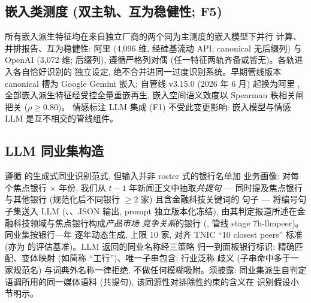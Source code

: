 \subsection{嵌入类测度 (双主轨、互为稳健性; F5)}
所有嵌入派生特征均在来自独立厂商的两个同为主测度的嵌入模型下并行
计算、并排报告、互为稳健性: 阿里 
(4{,}096 维, 经硅基流动 API; canonical 无后缀列) 与 OpenAI
 (3{,}072 维;  后缀列),
遵循严格列对偶 (任一特征两轨齐备或皆无)。各轨进入各自恰好识别的
独立设定, 绝不合并进同一过度识别系统。早期管线版本 canonical 槽为
Google Gemini 嵌入; 自管线 v3.15.0 (2026 年 6 月) 起换为阿里
, 全部嵌入派生特征经受控全量重嵌再生,
嵌入空间语义效度以 Spearman 秩相关闸把关 ($\rho \geq 0.80$)。
情感标注 LLM 集成 (F1) 不受此变更影响: 嵌入模型与情感 LLM
是互不相交的管线组件。

\subsection{LLM 同业集构造}
遵循 \textcite{cao2025genai} 的生成式同业识别范式, 但输入并非 roster 式的银行名单加
业务画像: 对每个焦点银行 $\times$ 年份, 我们从 $t-1$ 年新闻正文中抽取\emph{共提句}
--- 同时提及焦点银行与其他银行 (规范化后不同银行 $\geq 2$ 家) 且含金融科技关键词的
句子 --- 将编号句子集送入 LLM (、、JSON 输出,
prompt 独立版本化冻结), 由其判定报道所述在金融科技领域与焦点银行构成\emph{产品市场
竞争关系}的银行 (, 管线 stage 7h-llmpeer)。同业集按银行—年
逐年动态生成, 上限 10 家, 对齐 \textcite{hoberg2016textnetwork} TNIC ``10 closest
peers'' 标准 (亦为 \textcite{cao2025genai} 的评估基准)。LLM 返回的同业名称经三策略
归一到面板银行标识: 精确匹配、变体映射 (如简称 ``工行'')、唯一子串包含; 行业泛称
歧义 (子串命中多于一家规范名) 与词典外名称一律拒绝, 不做任何模糊吸附。须披露:
同业集派生自判定语调所用的同一媒体语料 (共提句), 该同源性对排除性约束的含义在
识别假设小节明示。

